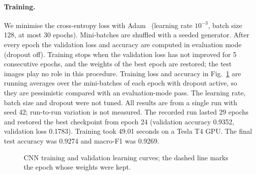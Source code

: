 \paragraph{Training.}
We minimise the cross-entropy loss with Adam~\cite{kingma2015adam} (learning rate $10^{-3}$, batch size 128,
at most 30 epochs). Mini-batches are shuffled with a seeded generator. After every epoch the validation loss and
accuracy are computed in evaluation mode (dropout off). Training stops when the validation loss has not improved for
5 consecutive epochs, and the weights of the best epoch are restored; the test images play no role in this
procedure. Training loss and accuracy in Fig.~\ref{fig:curves} are running averages over the mini-batches of
each epoch with dropout active, so they are pessimistic compared with an evaluation-mode pass. The learning rate,
batch size and dropout were not tuned. All results are from a single run with seed 42; run-to-run variation is not
measured. The recorded run lasted 29 epochs and restored the best checkpoint from epoch 24 (validation accuracy 0.9352, validation loss 0.1783). Training took 49.01 seconds on a Tesla T4 GPU. The final test accuracy was 0.9274 and macro-F1 was 0.9269.

\begin{figure}[t]
\centering
{}
\caption{CNN training and validation learning curves; the dashed line marks the epoch whose weights were kept.}
\label{fig:curves}
\end{figure}
